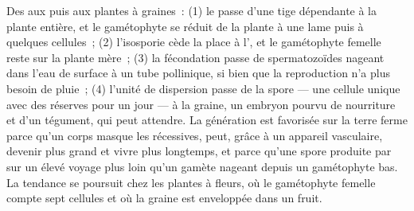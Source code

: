 \begin{proposition}\label{prop:b2:plant-life-cycles:trends}
Des  aux  puis aux plantes à graines~: (1) le 
passe d'une tige dépendante à la plante entière, et le gamétophyte se
réduit de la plante à une lame puis à quelques cellules~; (2)
l'isosporie cède la place à l', et le gamétophyte femelle
reste sur la plante mère~; (3) la fécondation passe de spermatozoïdes
nageant dans l'eau de surface à un tube pollinique, si bien que la
reproduction n'a plus besoin de pluie~; (4) l'unité de dispersion passe
de la spore --- une cellule unique avec des réserves pour un jour --- à
la graine, un embryon pourvu de nourriture et d'un tégument, qui peut
attendre. La génération  est favorisée sur la terre ferme parce
qu'un corps  masque les  récessives, peut, grâce à un
appareil vasculaire, devenir plus grand et vivre plus longtemps, et
parce qu'une spore produite par  sur un  élevé voyage
plus loin qu'un gamète nageant depuis un gamétophyte bas. La tendance
se poursuit chez les plantes à fleurs, où le gamétophyte femelle compte
sept cellules et où la graine est enveloppée dans un fruit.
\end{proposition}

